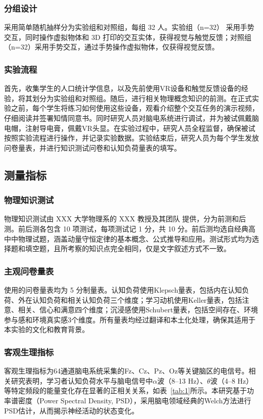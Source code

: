 \documentclass[runningheads]{llncs}
\begin{document}
\subsubsection{分组设计} 采用简单随机抽样分为实验组和对照组，每组 32 人。实验组（n=32） 采用手势交互，同时操作虚拟物体和 3D 打印的交互实体，获得视觉与触觉反馈；对照组（n=32）采用手势交互，通过手势操作虚拟物体，仅获得视觉反馈。

\subsubsection{实验流程}
首先，收集学生的人口统计学信息，以及先前使用VR设备和触觉反馈设备的经验，将其划分为实验组和对照组。随后，进行相关物理概念知识的前测。在正式实验之前，每个学生将练习如何使用这些设备，观看介绍整个交互任务的演示视频，仔细阅读并签署知情同意书。同时研究人员对脑电系统进行调试，并为被试佩戴脑电帽，注射导电膏，佩戴VR头显。在实验过程中，研究人员全程监督，确保被试按照实验流程进行操作，并记录实验数据。实验结束后，研究人员为每个学生发放问卷量表，并进行知识测试问卷和认知负荷量表的填写。

\subsection{测量指标}
\subsubsection{物理知识测试}
物理知识测试由 XXX 大学物理系的 XXX 教授及其团队
提供，分为前测和后测。前后测各包含 10 项测试，每项测试记 1 分，共 10 分。前后测均选自经典高中中物理试题，涵盖动量守恒定律的基本概念、公式推导和应用。测试形式均为选择题和填空题，且所考察的知识点完全相同，仅是文字叙述方式不一致。

\subsubsection{主观问卷量表}
使用的问卷量表均为 5 分制量表。认知负荷使用Klepsch量表\cite{klepsch2017development}，包括内在认知负荷、外在认知负荷和相关认知负荷三个维度；学习动机使用Keller量表\cite{keiier1987systematic}，包括注意、相关、信心和满意四个维度；沉浸感使用Schubert量表\cite{schubert2001experience}，包括空间存在、环境参与感和环境真实感3个维度。所有量表均经过翻译和本土化处理，确保其适用于本实验的文化和教育背景。

\subsubsection{客观生理指标}
客观生理指标为64通道脑电系统采集的Fz、Cz、Pz、Oz等关键脑区的电信号。相关研究表明，学习者认知负荷水平与脑电信号中$\alpha$波（8–13 Hz）、$\theta$波（4–8 Hz）等特定频段的能量变化存在显著的正相关关系，如表~\ref{tab:1}所示。本研究基于功率谱密度（Power Spectral Density, PSD），采用脑电领域经典的Welch方法进行PSD估计，从而揭示神经活动的状态变化。
\end{document}
